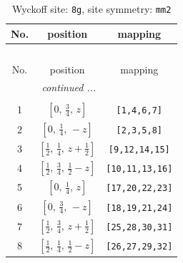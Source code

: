 \documentclass[fleqn,8pt]{jsarticle}
\begin{document}
\begin{longtable}{ccc}
\caption{Wyckoff site: {\tt 8g}, site symmetry: {\tt mm2}}
 \\
 \hline \hline
No. & position & mapping \\ \hline \endfirsthead

\multicolumn{2}{l}{\tablename\ \thetable{}} \\
 \hline \hline
No. & position & mapping \\ \hline \endhead

 \hline \hline
\multicolumn{2}{r}{\footnotesize\it continued ...} \\ \endfoot

 \hline \hline
\multicolumn{2}{r}{} \\ \endlastfoot

1 & $\left[ 0,\, \frac{3}{4},\, z \right]$ & {\tt [1,4,6,7]} \\ \hline
2 & $\left[ 0,\, \frac{1}{4},\, - z \right]$ & {\tt [2,3,5,8]} \\ \hline
3 & $\left[ \frac{1}{2},\, \frac{1}{4},\, z + \frac{1}{2} \right]$ & {\tt [9,12,14,15]} \\ \hline
4 & $\left[ \frac{1}{2},\, \frac{3}{4},\, \frac{1}{2} - z \right]$ & {\tt [10,11,13,16]} \\ \hline
5 & $\left[ 0,\, \frac{1}{4},\, z \right]$ & {\tt [17,20,22,23]} \\ \hline
6 & $\left[ 0,\, \frac{3}{4},\, - z \right]$ & {\tt [18,19,21,24]} \\ \hline
7 & $\left[ \frac{1}{2},\, \frac{3}{4},\, z + \frac{1}{2} \right]$ & {\tt [25,28,30,31]} \\ \hline
8 & $\left[ \frac{1}{2},\, \frac{1}{4},\, \frac{1}{2} - z \right]$ & {\tt [26,27,29,32]} \\
\end{longtable}
\renewcommand{\arraystretch}{1.2}
\end{document}
